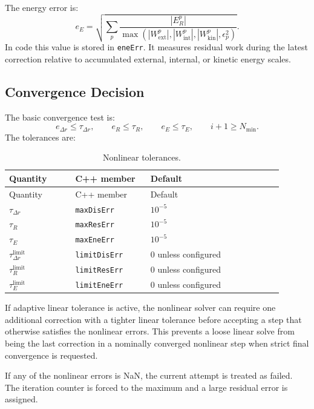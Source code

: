 \documentclass[11pt,a4paper]{article}
\newcommand{\code}[1]{\ifmmode\text{\texttt{\detokenize{#1}}}\else\nolinkurl{#1}\fi}
\newcommand{\abs}[1]{\left\lvert #1 \right\rvert}
\begin{document}
The energy error is:
\[
  e_E =
  \sqrt{
  \sum_p
  \frac{\abs{E_R^p}}
       {\max\left(
          \abs{W_{\mathrm{ext}}^p},
          \abs{W_{\mathrm{int}}^p},
          \abs{W_{\mathrm{kin}}^p},
          \epsilon_p^2
       \right)}
  }.
\]
In code this value is stored in \code{eneErr}.  It measures residual work during
the latest correction relative to accumulated external, internal, or kinetic
energy scales.

\subsection{Convergence Decision}

The basic convergence test is:
\[
  e_{\Delta r} \leq \tau_{\Delta r},
  \qquad
  e_R \leq \tau_R,
  \qquad
  e_E \leq \tau_E,
  \qquad
  i+1 \geq N_{\min}.
\]
The tolerances are:

\begin{longtable}{p{0.22\linewidth} p{0.25\linewidth} p{0.44\linewidth}}
\caption{Nonlinear tolerances.}
\label{tab:tolerances}\\
\toprule
Quantity & C++ member & Default \\
\midrule
\endfirsthead
\toprule
Quantity & C++ member & Default \\
\midrule
\endhead
\(\tau_{\Delta r}\) & \code{maxDisErr} & \(10^{-5}\) \\
\(\tau_R\) & \code{maxResErr} & \(10^{-5}\) \\
\(\tau_E\) & \code{maxEneErr} & \(10^{-5}\) \\
\(\tau_{\Delta r}^{\mathrm{limit}}\) & \code{limitDisErr} & 0 unless configured \\
\(\tau_R^{\mathrm{limit}}\) & \code{limitResErr} & 0 unless configured \\
\(\tau_E^{\mathrm{limit}}\) & \code{limitEneErr} & 0 unless configured \\
\bottomrule
\end{longtable}

If adaptive linear tolerance is active, the nonlinear solver can require one
additional correction with a tighter linear tolerance before accepting a step
that otherwise satisfies the nonlinear errors.  This prevents a loose linear
solve from being the last correction in a nominally converged nonlinear step
when strict final convergence is requested.

If any of the nonlinear errors is NaN, the current attempt is treated as failed.
The iteration counter is forced to the maximum and a large residual error is
assigned.
\end{document}
